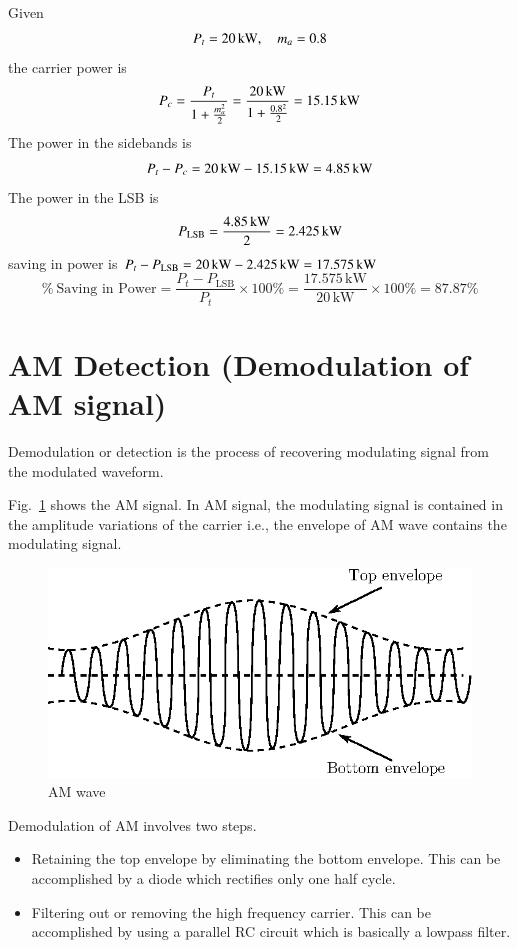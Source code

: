 \begin{solution}
Given
$$
P_{t}=20\text{\,kW},\quad m_{a}=0.8
$$
the carrier power is
$$
P_{c}=\dfrac{P_{t}}{1+\frac{m^{2}_{a}}{2}}=\frac{20\text{\,kW}}{1+\frac{0.8^{2}}{2}}=15.15\text{\,kW}
$$
The power in the sidebands is
$$
P_{t}-P_{c}=20\text{\,kW}-15.15\text{\,kW}=4.85\text{\,kW}
$$
The power in the LSB is
$$
P_{\text{LSB}}=\dfrac{4.85\,\text{kW}}{2}=2.425\text{\,kW}
$$
saving in power is $P_{t}-P_{\text{LSB}}=20\,\text{kW}-2.425\,\text{kW}=17.575\text{\,kW}$
$$
\% \ \text{Saving in Power} = \frac{P_{t}-P_{\text{LSB}}}{P_{t}}\times 100\%=\frac{17.575\,\text{kW}}{20\,\text{kW}}\times 100\%=87.87\%
$$
\vskip -1cm
\end{solution}

\section{AM Detection (Demodulation of AM signal)}\label{sec9.16}

Demodulation or detection is the process of recovering modulating signal from the modulated waveform.

Fig.~\ref{fig9.6} shows the AM signal. In AM signal, the modulating signal is contained in the amplitude variations of the carrier i.e., the envelope of AM wave contains the modulating signal.
\begin{figure}[H]
\centering
\includegraphics{chap9/fig8.6.eps}
\caption{AM wave}\label{fig9.6}
\end{figure}

Demodulation of AM involves two steps.
\begin{itemize}
\itemsep=0pt
\item Retaining the top envelope by eliminating the bottom envelope. This can be accomplished by a diode which rectifies only one half cycle.

\item Filtering out or removing the high frequency carrier. This can be accomplished by using a parallel RC circuit which is basically a lowpass filter.
\end{itemize}

